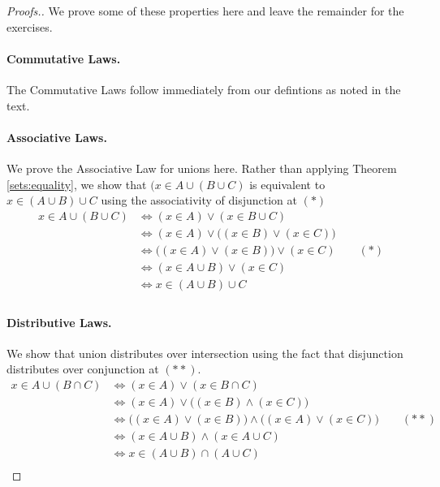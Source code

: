 \begin{proof}[Proofs.] We prove some of these properties here and leave the remainder for the exercises. 

\paragraph{Commutative Laws.} The Commutative Laws follow immediately from our defintions as noted in the text.

\paragraph{Associative Laws.} We prove the Associative Law for unions here. Rather than applying Theorem \ref{sets:equality}, we show that $(x\in A\cup(B\cup C)$ is equivalent to $x\in(A\cup B)\cup C$ using the associativity of disjunction at $(*)$
\begin{equation*}
\begin{split}
x\in A\cup(B\cup C) &\Leftrightarrow (x\in A) \lor (x\in B\cup C)\\
&\Leftrightarrow (x\in A) \lor \bigl( (x\in B)\lor (x\in C)\bigr)\\
&\Leftrightarrow \bigl( (x\in A)\lor (x\in B)\bigr) \lor (x\in C) \qquad (*)\\
&\Leftrightarrow (x\in A\cup B) \lor (x\in C)\\
&\Leftrightarrow x\in (A\cup B)\cup C\\
\end{split}
\end{equation*}

\paragraph{Distributive Laws.} We show that union distributes over intersection using the fact that disjunction distributes over conjunction at $(**)$.
\begin{equation*}
\begin{split}
x\in A\cup(B\cap C) &\Leftrightarrow (x\in A) \lor (x\in B\cap C)\\
&\Leftrightarrow (x\in A) \lor \bigl( (x\in B)\land (x\in C)\bigr)\\
&\Leftrightarrow \bigl((x\in A)\lor (x\in B)\bigr)\land\bigl((x\in A)\lor (x\in C)\bigr) \qquad (**)\\
&\Leftrightarrow (x\in A\cup B) \land (x\in A\cup C)\\
&\Leftrightarrow x\in (A\cup B)\cap(A\cup C)\\
\end{split}
\end{equation*}


\end{proof}
